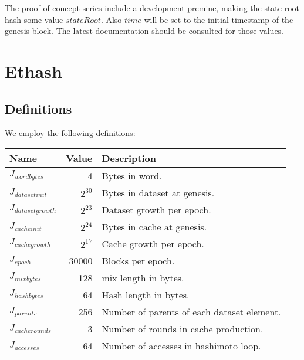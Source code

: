 \documentclass[9pt,oneside]{amsart}
\begin{document}
The proof-of-concept series include a development premine, making the state root hash some value $stateRoot$. Also $time$ will be set to the initial timestamp of the genesis block. The latest documentation should be consulted for those values.

\section{Ethash}\label{app:ethash}
\subsection{Definitions}
We employ the following definitions:

\begin{tabular*}{\columnwidth}[h]{lrl}
\toprule
Name & Value & Description \\
\midrule
$J_{wordbytes}$ & 4  & Bytes in word. \\
$J_{datasetinit}$ & $2^{30}$ & Bytes in dataset at genesis. \\
$J_{datasetgrowth}$ & $2^{23}$ & Dataset growth per epoch. \\
$J_{cacheinit}$ & $2^{24}$ & Bytes in cache at genesis. \\
$J_{cachegrowth}$ & $2^{17}$ & Cache growth per epoch. \\
$J_{epoch}$ & 30000 & Blocks per epoch. \\
$J_{mixbytes}$ & 128 & mix length in bytes. \\
$J_{hashbytes}$ & 64 & Hash length in bytes. \\
$J_{parents}$ & 256 & Number of parents of each dataset element. \\
$J_{cacherounds}$ & 3 & Number of rounds in cache production. \\
$J_{accesses}$ & 64 & Number of accesses in hashimoto loop. \\
\bottomrule
\end{tabular*}
\end{document}

